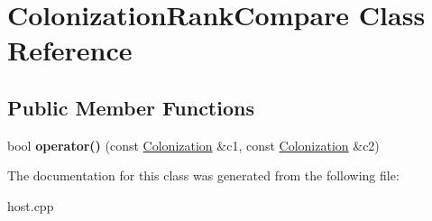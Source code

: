 \hypertarget{class_colonization_rank_compare}{}\section{Colonization\+Rank\+Compare Class Reference}
\label{class_colonization_rank_compare}
\subsection*{Public Member Functions}
\begin{DoxyCompactItemize}
\item 
\mbox{\label{class_colonization_rank_compare_a3fe54535f8fcf997393abffe13dfe9aa}} 
bool {\bfseries operator()} (const \hyperlink{class_colonization}{Colonization} \&c1, const \hyperlink{class_colonization}{Colonization} \&c2)
\end{DoxyCompactItemize}


The documentation for this class was generated from the following file\+:\begin{DoxyCompactItemize}
\item 
host.\+cpp\end{DoxyCompactItemize}
